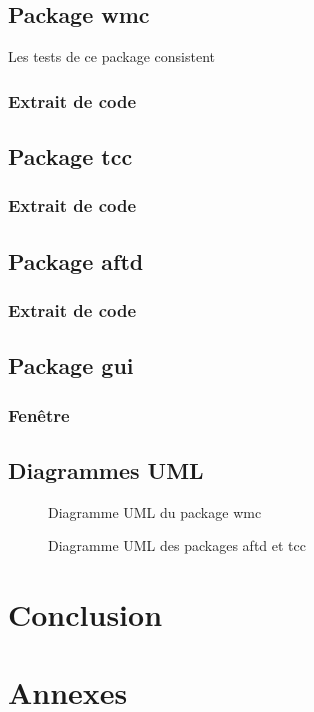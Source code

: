 \documentclass[11pt]{report}
\begin{document}
	\section{Package wmc}
		Les tests de ce package consistent 
		\subsection{Extrait de code}
		
	\section{Package tcc}
		\subsection{Extrait de code}
		
	\section{Package aftd}
		\subsection{Extrait de code}
		
	\section{Package gui}
		\subsection{Fenêtre}
		
	\section{Diagrammes UML}
		
		\begin{figure}[h]
			\centering
			\caption{Diagramme UML du package wmc}
			\label{uml1}
		\end{figure}
		
		\begin{figure}[h]
			\centering
			\caption{Diagramme UML des packages aftd et tcc}
			\label{uml2}
		\end{figure}
		

\chapter{Conclusion}

\chapter{Annexes}
		
		
		
\end{document}
